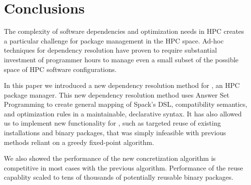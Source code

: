 \section{Conclusions}
\label{sec:conclusions}

The complexity of software dependencies and optimization needs in HPC creates a particular challenge for package management in the HPC space.
Ad-hoc techniques for dependency resolution have proven to require substantial investment of programmer hours to manage even a small subset of the possible space of HPC software configurations.

In this paper we introduced a new dependency resolution method for \spack{}, an HPC package manager.
This new dependency resolution method uses Answer Set Programming to create general mapping of Spack's DSL, compatibility semantics, and optimization rules in a maintainable, declarative syntax.
It has also allowed us to implement new functionality for \spack{}, such as targeted reuse of existing installations and binary packages, that was simply infeasible with previous methods reliant on a greedy fixed-point algorithm.

We also showed the performance of the new concretization algorithm is competitive in most cases with the previous algorithm.
Performance of the reuse capablity scaled to tens of thousands of potentially reusable binary packages.

